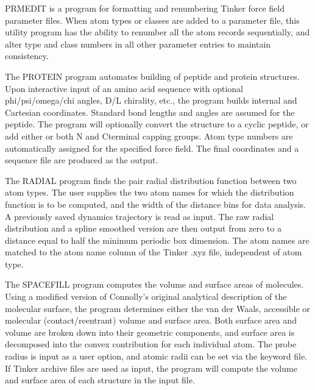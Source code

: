 \documentclass[letterpaper,11pt,english]{sphinxmanual}
\begin{document}

PRMEDIT is a program for formatting and renumbering Tinker force field parameter files. When atom types or classes are added to a parameter file, this utility program has the ability to renumber all the atom records sequentially, and alter type and class numbers in all other parameter entries to maintain consistency.


The PROTEIN program automates building of peptide and protein structures. Upon interactive input of an amino acid sequence with optional phi/psi/omega/chi angles, D/L chirality, etc., the program builds internal and Cartesian coordinates. Standard bond lengths and angles are assumed for the peptide. The program will optionally convert the structure to a cyclic peptide, or add either or both N\sphinxhyphen{} and C\sphinxhyphen{}terminal capping groups. Atom type numbers are automatically assigned for the specified force field. The final coordinates and a sequence file are produced as the output.


The RADIAL program finds the pair radial distribution function between two atom types. The user supplies the two atom names for which the distribution function is to be computed, and the width of the distance bins for data analysis. A previously saved dynamics trajectory is read as input. The raw radial distribution and a spline smoothed version are then output from zero to a distance equal to half the minimum periodic box dimension. The atom names are matched to the atom name column of the Tinker .xyz file, independent of atom type.


The SPACEFILL program computes the volume and surface areas of molecules. Using a modified version of Connolly’s original analytical description of the molecular surface, the program determines either the van der Waals, accessible or molecular (contact/reentrant) volume and surface area. Both surface area and volume are broken down into their geometric components, and surface area is decomposed into the convex contribution for each individual atom. The probe radius is input as a user option, and atomic radii can be set via the keyword file. If Tinker archive files are used as input, the program will compute the volume and surface area of each structure in the input file.

\end{document}
